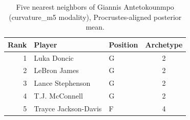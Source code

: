 \begin{table}[htbp]
  \centering\small
  \begin{tabular}{rllc}
    \toprule
    Rank & Player & Position & Archetype \\
    \midrule
    1 & Luka Doncic & G & 2 \\
    2 & LeBron James & G & 2 \\
    3 & Lance Stephenson & G & 2 \\
    4 & T.J. McConnell & G & 2 \\
    5 & Trayce Jackson-Davis & F & 4 \\
    \bottomrule
  \end{tabular}
  \caption{Five nearest neighbors of Giannis Antetokounmpo (curvature_m5 modality), Procrustes-aligned posterior mean.}
  \label{tab:Giannis_Antetokounmpo_neighbors_curvature_m5}
\end{table}

